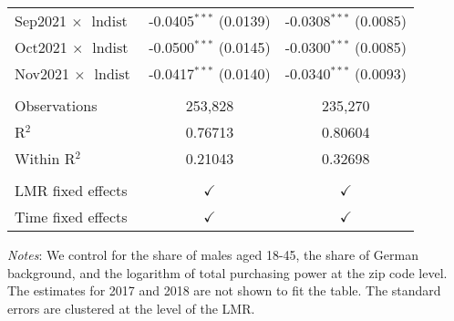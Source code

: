 \begin{table}
\begin{threeparttable}[b]
\begin{tabular}{lcc}
         Sep2021 $\times$ $\ln \text{dist}$    & -0.0405$^{***}$ (0.0139) & -0.0308$^{***}$ (0.0085)\\   
         Oct2021 $\times$ $\ln \text{dist}$    & -0.0500$^{***}$ (0.0145) & -0.0300$^{***}$ (0.0085)\\   
         Nov2021 $\times$ $\ln \text{dist}$    & -0.0417$^{***}$ (0.0140) & -0.0340$^{***}$ (0.0093)\\   
          \\
         Observations                          & 253,828                  & 235,270\\  
         R$^2$                                 & 0.76713                  & 0.80604\\  
         Within R$^2$                          & 0.21043                  & 0.32698\\  
          \\
         LMR fixed effects                     & $\checkmark$             & $\checkmark$\\   
         Time fixed effects                    & $\checkmark$             & $\checkmark$\\   
         \bottomrule
      \end{tabular}
      
      \begin{tablenotes}\item \textit{Notes}: We control for the share of males aged 18-45, the share of German background, and the logarithm of total purchasing power at the zip code level. The estimates for 2017 and 2018 are not shown to fit the table. The standard errors are clustered at the level of the LMR.
      \end{tablenotes}
   \end{threeparttable}
\end{table}


